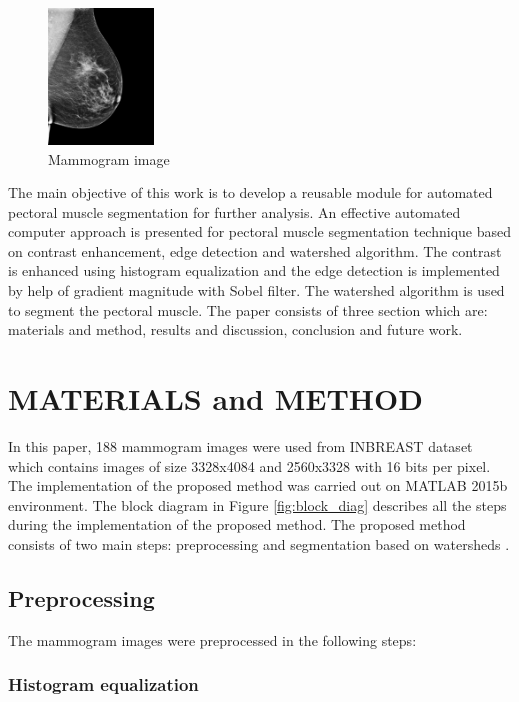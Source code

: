 \documentclass{article}
\begin{document}
\begin{figure}[h!]
    \centering
    \includegraphics[width=0.25\textwidth]{images/breast.jpg} 
    \caption{Mammogram image}
    \label{fig:mammogram}
\end{figure}  

The main objective of this work is to develop a reusable module for automated pectoral muscle segmentation for further analysis. An effective automated computer approach is presented for pectoral muscle segmentation technique based on contrast enhancement, edge detection and watershed algorithm. The contrast is enhanced using histogram equalization and the edge detection is implemented by help of gradient magnitude with Sobel filter. The watershed algorithm is used to segment the pectoral muscle. The paper consists of three section which are: materials and method, results and discussion, conclusion and future work.

\section{MATERIALS and METHOD}
\label{sec:mat_and_meth}

In this paper, 188 mammogram images were used from INBREAST dataset which contains images of size 3328x4084 and 2560x3328 with 16 bits per pixel. The implementation of the proposed method was carried out on MATLAB 2015b environment. The block diagram in Figure \ref{fig:block_diag} describes all the steps during the implementation of the proposed method. The proposed method consists of two main steps: preprocessing and segmentation based on watersheds \cite{6}.

\subsection{Preprocessing}
\label{ssec:Preprocessing}

The mammogram images were preprocessed in the following steps:
 
\subsubsection{Histogram equalization}
\label{sssec:hist_eq}
\end{document}
